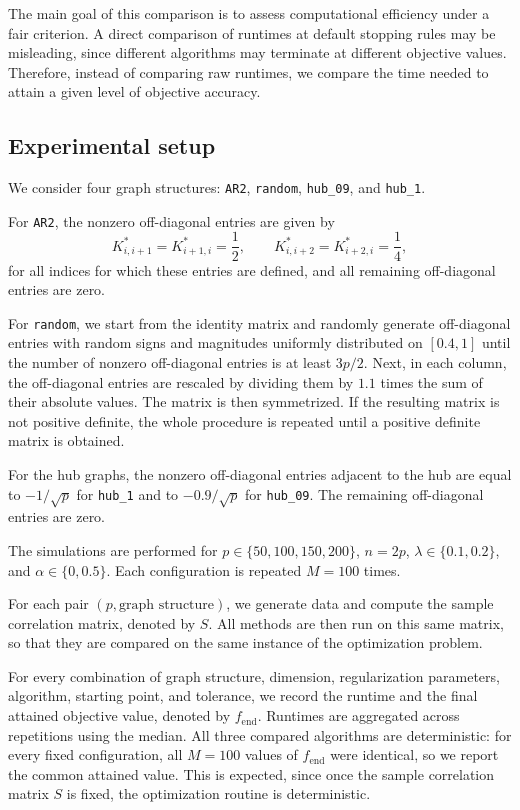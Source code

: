 \documentclass[12pt]{amsart}
\numberwithin{equation}{section}
\numberwithin{equation}{section}
\theoremstyle{plain}
\theoremstyle{definition}
\begin{document}
The main goal of this comparison is to assess computational efficiency under a fair criterion.
A direct comparison of runtimes at default stopping rules may be misleading, since different algorithms may terminate at different objective values.
Therefore, instead of comparing raw runtimes, we compare the time needed to attain a given level of objective accuracy.

\subsection{Experimental setup}
We consider four graph structures:
\texttt{AR2}, \texttt{random}, \texttt{hub\_09}, and \texttt{hub\_1}.

For \texttt{AR2}, the nonzero off-diagonal entries are given by
\[
K^\ast_{i,i+1} = K^\ast_{i+1,i} = \frac12,
\qquad
K^\ast_{i,i+2} = K^\ast_{i+2,i} = \frac14,
\]
for all indices for which these entries are defined, and all remaining off-diagonal entries are zero.

For \texttt{random}, we start from the identity matrix and randomly generate off-diagonal entries with random signs and magnitudes uniformly distributed on $[0.4,1]$ until the number of nonzero off-diagonal entries is at least $3p/2$.
Next, in each column, the off-diagonal entries are rescaled by dividing them by $1.1$ times the sum of their absolute values.
The matrix is then symmetrized.
If the resulting matrix is not positive definite, the whole procedure is repeated until a positive definite matrix is obtained.

For the hub graphs, the nonzero off-diagonal entries adjacent to the hub are equal to $-1/\sqrt{p}$ for \texttt{hub\_1} and to $-0.9/\sqrt{p}$ for \texttt{hub\_09}.
The remaining off-diagonal entries are zero.

The simulations are performed for
$p \in \{50, 100, 150, 200\}$,
$n = 2p$,
$\lambda \in \{0.1, 0.2\}$,
and
$\alpha \in \{0, 0.5\}$.
Each configuration is repeated $M = 100$ times.

For each pair $(p, \mbox{graph structure})$, we generate data and compute the sample correlation matrix, denoted by $S$.
All methods are then run on this same matrix, so that they are compared on the same instance of the optimization problem.

For every combination of graph structure, dimension, regularization parameters, algorithm, starting point, and tolerance, we record the runtime and the final attained objective value, denoted by $f_{\mathrm{end}}$.
Runtimes are aggregated across repetitions using the median.
All three compared algorithms are deterministic: for every fixed configuration, all $M = 100$ values of $f_{\mathrm{end}}$ were identical, so we report the common attained value.
This is expected, since once the sample correlation matrix $S$ is fixed, the optimization routine is deterministic.
\end{document}
